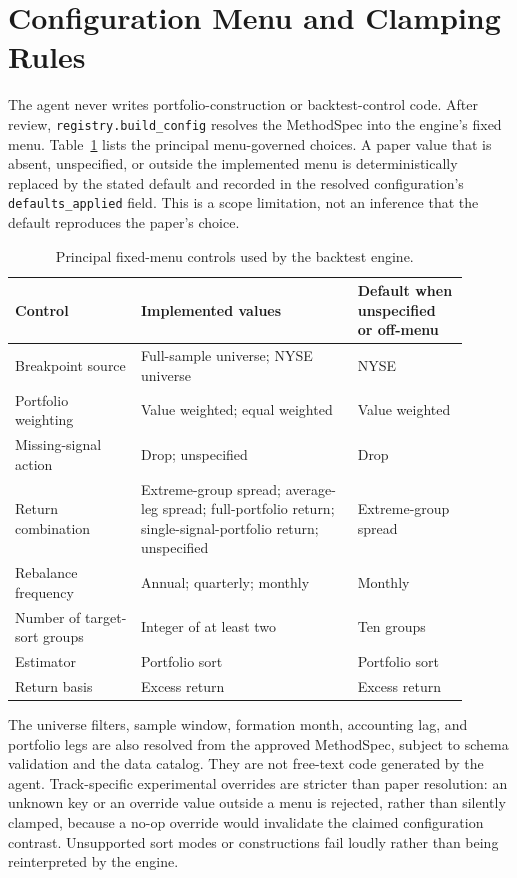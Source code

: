 \section{Configuration Menu and Clamping Rules}
\label{app:config-menu}

The agent never writes portfolio-construction or backtest-control code. After
review, \texttt{registry.build\_config} resolves the MethodSpec into the
engine's fixed menu. Table~\ref{tab:config-menu} lists the principal
menu-governed choices. A paper value that is absent, unspecified, or outside
the implemented menu is deterministically replaced by the stated default and
recorded in the resolved configuration's \texttt{defaults\_applied} field.
This is a scope limitation, not an inference that the default reproduces the
paper's choice.

\begin{table}[htbp]
  \centering
  \small
  \caption{Principal fixed-menu controls used by the backtest engine.}
  \label{tab:config-menu}
  \begin{tabular}{p{0.25\linewidth}p{0.43\linewidth}p{0.22\linewidth}}
    \toprule
    Control & Implemented values & Default when unspecified or off-menu \\
    \midrule
    Breakpoint source & Full-sample universe; NYSE universe & NYSE \\
    Portfolio weighting & Value weighted; equal weighted & Value weighted \\
    Missing-signal action & Drop; unspecified & Drop \\
    Return combination & Extreme-group spread; average-leg spread;
      full-portfolio return; single-signal-portfolio return; unspecified &
      Extreme-group spread \\
    Rebalance frequency & Annual; quarterly; monthly & Monthly \\
    Number of target-sort groups & Integer of at least two & Ten groups \\
    Estimator & Portfolio sort & Portfolio sort \\
    Return basis & Excess return & Excess return \\
    \bottomrule
  \end{tabular}
\end{table}

The universe filters, sample window, formation month, accounting lag, and
portfolio legs are also resolved from the approved MethodSpec, subject to
schema validation and the data catalog. They are not free-text code generated
by the agent. Track-specific experimental overrides are stricter than paper
resolution: an unknown key or an override value outside a menu is rejected,
rather than silently clamped, because a no-op override would invalidate the
claimed configuration contrast. Unsupported sort modes or constructions fail
loudly rather than being reinterpreted by the engine.
